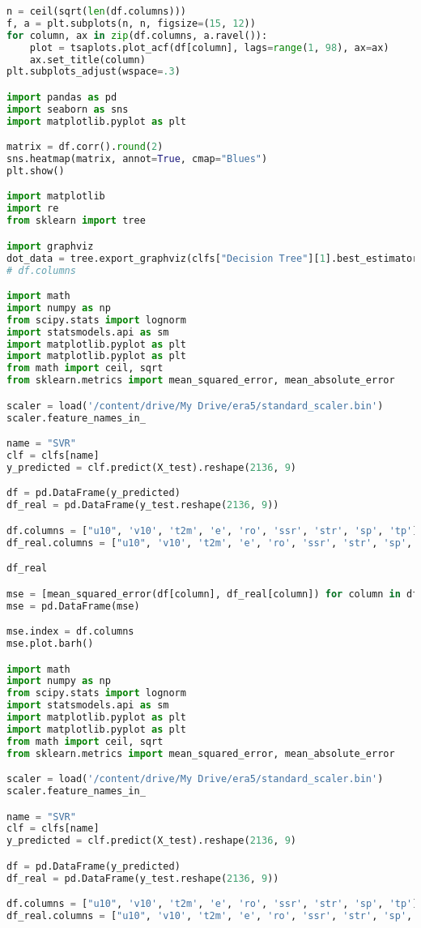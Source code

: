 \begin{lstlisting}[label=python-listing,caption={Kod źródłowy},language=python]
n = ceil(sqrt(len(df.columns)))
f, a = plt.subplots(n, n, figsize=(15, 12))
for column, ax in zip(df.columns, a.ravel()):
    plot = tsaplots.plot_acf(df[column], lags=range(1, 98), ax=ax)
    ax.set_title(column)
plt.subplots_adjust(wspace=.3)

import pandas as pd
import seaborn as sns
import matplotlib.pyplot as plt

matrix = df.corr().round(2)
sns.heatmap(matrix, annot=True, cmap="Blues")
plt.show()

import matplotlib
import re
from sklearn import tree

import graphviz 
dot_data = tree.export_graphviz(clfs["Decision Tree"][1].best_estimator_, out_file='tree.dot') 
# df.columns

import math
import numpy as np
from scipy.stats import lognorm
import statsmodels.api as sm
import matplotlib.pyplot as plt
import matplotlib.pyplot as plt
from math import ceil, sqrt
from sklearn.metrics import mean_squared_error, mean_absolute_error

scaler = load('/content/drive/My Drive/era5/standard_scaler.bin')
scaler.feature_names_in_

name = "SVR"
clf = clfs[name]
y_predicted = clf.predict(X_test).reshape(2136, 9)

df = pd.DataFrame(y_predicted)
df_real = pd.DataFrame(y_test.reshape(2136, 9))

df.columns = ["u10", 'v10', 't2m', 'e', 'ro', 'ssr', 'str', 'sp', 'tp']
df_real.columns = ["u10", 'v10', 't2m', 'e', 'ro', 'ssr', 'str', 'sp', 'tp']

df_real

mse = [mean_squared_error(df[column], df_real[column]) for column in df.columns]
mse = pd.DataFrame(mse)

mse.index = df.columns
mse.plot.barh()

import math
import numpy as np
from scipy.stats import lognorm
import statsmodels.api as sm
import matplotlib.pyplot as plt
import matplotlib.pyplot as plt
from math import ceil, sqrt
from sklearn.metrics import mean_squared_error, mean_absolute_error

scaler = load('/content/drive/My Drive/era5/standard_scaler.bin')
scaler.feature_names_in_

name = "SVR"
clf = clfs[name]
y_predicted = clf.predict(X_test).reshape(2136, 9)

df = pd.DataFrame(y_predicted)
df_real = pd.DataFrame(y_test.reshape(2136, 9))

df.columns = ["u10", 'v10', 't2m', 'e', 'ro', 'ssr', 'str', 'sp', 'tp']
df_real.columns = ["u10", 'v10', 't2m', 'e', 'ro', 'ssr', 'str', 'sp', 'tp']


\end{lstlisting}

